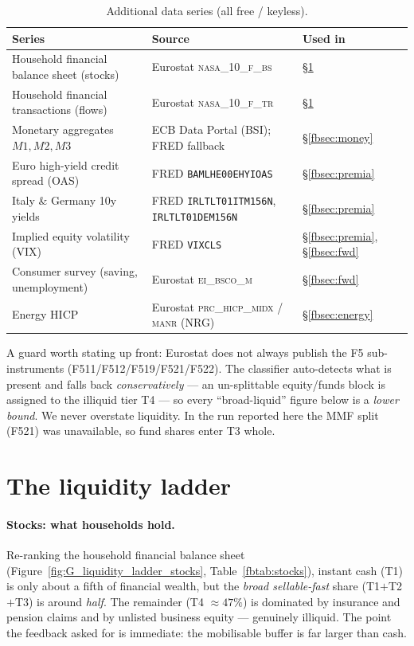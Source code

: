 \documentclass[11pt,a4paper]{article}
\newcommand{\code}[1]{\texttt{#1}}
\newcommand{\dataset}[1]{\textsc{#1}}
\begin{document}
\begin{table}[htbp]\centering\small
\caption{Additional data series (all free / keyless).}
\label{fbtab:data}
\begin{tabular}{@{}p{4.6cm}p{5.0cm}p{5.2cm}@{}}
\toprule
\textbf{Series} & \textbf{Source} & \textbf{Used in} \\
\midrule
Household financial balance sheet (stocks) & Eurostat \dataset{nasa\_10\_f\_bs} &
  \S\ref{fbsec:ladder} \\
Household financial transactions (flows) & Eurostat \dataset{nasa\_10\_f\_tr} &
  \S\ref{fbsec:ladder} \\
Monetary aggregates $M1,M2,M3$ & ECB Data Portal (\dataset{BSI}); FRED fallback &
  \S\ref{fbsec:money} \\
Euro high-yield credit spread (OAS) & FRED \code{BAMLHE00EHYIOAS} &
  \S\ref{fbsec:premia} \\
Italy \& Germany 10y yields & FRED \code{IRLTLT01ITM156N}, \code{IRLTLT01DEM156N} &
  \S\ref{fbsec:premia} \\
Implied equity volatility (VIX) & FRED \code{VIXCLS} &
  \S\ref{fbsec:premia}, \S\ref{fbsec:fwd} \\
Consumer survey (saving, unemployment) & Eurostat \dataset{ei\_bsco\_m} &
  \S\ref{fbsec:fwd} \\
Energy HICP & Eurostat \dataset{prc\_hicp\_midx} / \dataset{manr} (NRG) &
  \S\ref{fbsec:energy} \\
\bottomrule
\end{tabular}
\end{table}

A guard worth stating up front: Eurostat does not always publish the F5
sub-instruments (F511/F512/F519/F521/F522). The classifier auto-detects what is
present and falls back \emph{conservatively} --- an un-splittable equity/funds
block is assigned to the illiquid tier T4 --- so every ``broad-liquid'' figure
below is a \emph{lower bound}. We never overstate liquidity. In the run reported
here the MMF split (F521) was unavailable, so fund shares enter T3 whole.

\section{The liquidity ladder}\label{fbsec:ladder}

\paragraph{Stocks: what households hold.} Re-ranking the household financial
balance sheet (Figure~\ref{fig:G_liquidity_ladder_stocks},
Table~\ref{fbtab:stocks}), instant cash (T1) is only about a fifth of financial
wealth, but the \emph{broad sellable-fast} share (T1$+$T2$+$T3) is around
\emph{half}. The remainder (T4 $\approx 47\%$) is dominated by insurance and
pension claims and by unlisted business equity --- genuinely illiquid. The point
the feedback asked for is immediate: the mobilisable buffer is far larger than
cash.
\end{document}
